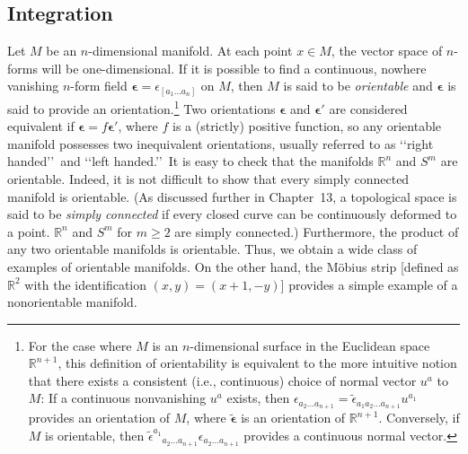 
\subsection{Integration}\label{sec:B.2}

Let \(M\) be an \(n\)-dimensional manifold. At each point \(x\in M\), the vector
space of \(n\)-forms will be one-dimensional. If it is possible to find a continuous,
nowhere vanishing \(n\)-form field
\(\boldsymbol\epsilon=\epsilon_{[a_1\ldots a_n]}\) on \(M\), then \(M\) is said to be
\emph{orientable} and \(\boldsymbol\epsilon\) is said to provide an
orientation.\footnote{For the case where \(M\) is an \(n\)-dimensional surface in the
Euclidean space \(\mathbb R^{n+1}\), this definition of orientability is equivalent to
the more intuitive notion that there exists a consistent (i.e., continuous) choice of
normal vector \(u^a\) to \(M\): If a continuous nonvanishing \(u^a\) exists, then
\(\epsilon_{a_2\ldots a_{n+1}}=
\widetilde\epsilon_{a_1a_2\ldots a_{n+1}}u^{a_1}\) provides an orientation of \(M\),
where \(\widetilde{\boldsymbol\epsilon}\) is an orientation of \(\mathbb R^{n+1}\).
Conversely, if \(M\) is orientable, then
\(\widetilde\epsilon^{a_1}{}_{a_2\ldots a_{n+1}}
\epsilon_{a_2\ldots a_{n+1}}\) provides a continuous normal vector.} Two
orientations \(\boldsymbol\epsilon\) and \(\boldsymbol\epsilon'\) are considered
equivalent if \(\boldsymbol\epsilon=f\boldsymbol\epsilon'\), where \(f\) is a
(strictly) positive function, so any orientable manifold possesses two inequivalent
orientations, usually referred to as \lq\lq right handed\rq\rq\ and
\lq\lq left handed.\rq\rq\ It is easy to check that the manifolds \(\mathbb R^n\) and
\(S^m\) are orientable. Indeed, it is not difficult to show that every simply
connected manifold is orientable. (As discussed further in Chapter~13, a topological
space is said to be \emph{simply connected} if every closed curve can be continuously
deformed to a point. \(\mathbb R^n\) and \(S^m\) for \(m\geq2\) are simply
connected.) Furthermore, the product of any two orientable manifolds is orientable.
Thus, we obtain a wide class of examples of orientable manifolds. On the other hand,
the M\"obius strip [defined as \(\mathbb R^2\) with the identification
\((x,y)=(x+1,-y)\)] provides a simple example of a nonorientable manifold.

